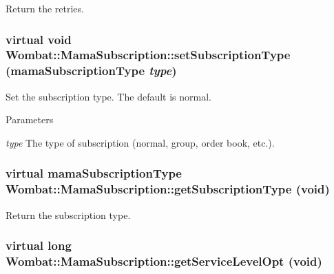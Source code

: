 Return the retries. \hypertarget{classWombat_1_1MamaSubscription_ae3a076d82e2e53d03e7414749333b65c}{
\subsubsection[{setSubscriptionType}]{\setlength{\rightskip}{0pt plus 5cm}virtual void Wombat::MamaSubscription::setSubscriptionType (mamaSubscriptionType {\em type})}}
\label{classWombat_1_1MamaSubscription_ae3a076d82e2e53d03e7414749333b65c}


Set the subscription type. The default is normal.


\begin{DoxyParams}{Parameters}
\item[{\em type}]The type of subscription (normal, group, order book, etc.). \end{DoxyParams}
\hypertarget{classWombat_1_1MamaSubscription_ad156d5629d85a95c9d6e64dfe871aa97}{
\subsubsection[{getSubscriptionType}]{\setlength{\rightskip}{0pt plus 5cm}virtual mamaSubscriptionType Wombat::MamaSubscription::getSubscriptionType (void)}}
\label{classWombat_1_1MamaSubscription_ad156d5629d85a95c9d6e64dfe871aa97}


Return the subscription type. \hypertarget{classWombat_1_1MamaSubscription_a9766dd84a8b7a28b22ff1393954cf1d9}{
\subsubsection[{getServiceLevelOpt}]{\setlength{\rightskip}{0pt plus 5cm}virtual long Wombat::MamaSubscription::getServiceLevelOpt (void)}}
\label{classWombat_1_1MamaSubscription_a9766dd84a8b7a28b22ff1393954cf1d9}


